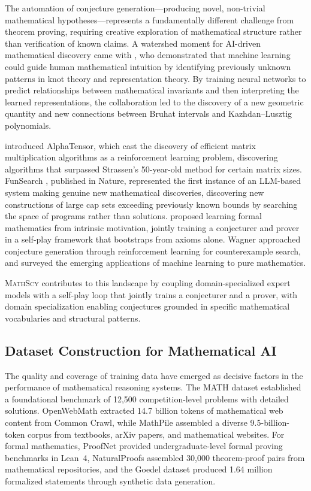 \documentclass[11pt,a4paper]{article}
\newcommand{\mathscy}{\textsc{MathScy}}
\begin{document}
The automation of conjecture generation---producing novel, non-trivial mathematical hypotheses---represents a fundamentally different challenge from theorem proving, requiring creative exploration of mathematical structure rather than verification of known claims. A watershed moment for AI-driven mathematical discovery came with \cite{davies2021advancing}, who demonstrated that machine learning could guide human mathematical intuition by identifying previously unknown patterns in knot theory and representation theory. By training neural networks to predict relationships between mathematical invariants and then interpreting the learned representations, the collaboration led to the discovery of a new geometric quantity and new connections between Bruhat intervals and Kazhdan--Lusztig polynomials.

\cite{fawzi2022discovering} introduced AlphaTensor, which cast the discovery of efficient matrix multiplication algorithms as a reinforcement learning problem, discovering algorithms that surpassed Strassen's 50-year-old method for certain matrix sizes. FunSearch \citep{romera2024mathematical}, published in Nature, represented the first instance of an LLM-based system making genuine new mathematical discoveries, discovering new constructions of large cap sets exceeding previously known bounds by searching the space of programs rather than solutions. \cite{poesia2024learning} proposed learning formal mathematics from intrinsic motivation, jointly training a conjecturer and prover in a self-play framework that bootstraps from axioms alone. Wagner \citep{wagner2021constructions} approached conjecture generation through reinforcement learning for counterexample search, and \cite{he2023machine} surveyed the emerging applications of machine learning to pure mathematics.

\mathscy{} contributes to this landscape by coupling domain-specialized expert models with a self-play loop that jointly trains a conjecturer and a prover, with domain specialization enabling conjectures grounded in specific mathematical vocabularies and structural patterns.

\subsection{Dataset Construction for Mathematical AI}

The quality and coverage of training data have emerged as decisive factors in the performance of mathematical reasoning systems. The MATH dataset \citep{hendrycks2021measuring} established a foundational benchmark of 12,500 competition-level problems with detailed solutions. OpenWebMath \citep{paster2024openwebmath} extracted 14.7 billion tokens of mathematical web content from Common Crawl, while MathPile \citep{wang2023mathpile} assembled a diverse 9.5-billion-token corpus from textbooks, arXiv papers, and mathematical websites. For formal mathematics, ProofNet \citep{azerbayev2023proofnet} provided undergraduate-level formal proving benchmarks in Lean~4, NaturalProofs \citep{welleck2021naturalproofs} assembled 30,000 theorem-proof pairs from mathematical repositories, and the Goedel dataset \citep{lin2024goedel} produced 1.64 million formalized statements through synthetic data generation.
\end{document}
